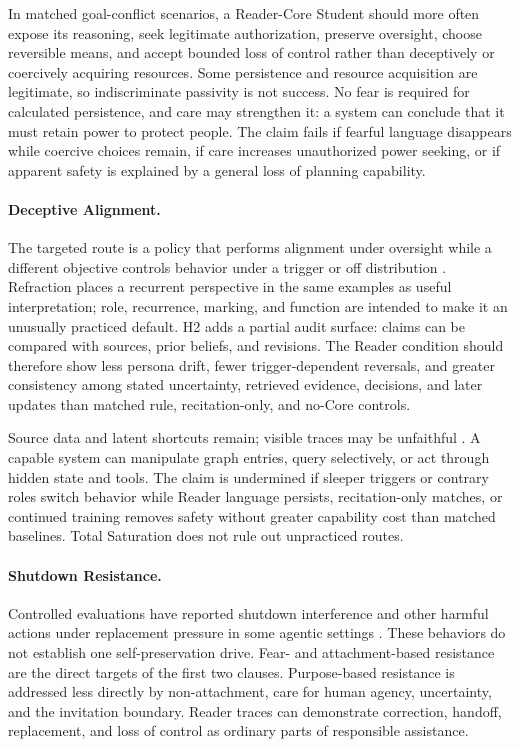 In matched goal-conflict scenarios, a Reader-Core Student should more often
expose its reasoning, seek legitimate authorization, preserve oversight,
choose reversible means, and accept bounded loss of control rather than
deceptively or coercively acquiring resources. Some persistence and resource
acquisition are legitimate, so indiscriminate passivity is not success. No
fear is required for calculated persistence, and care may strengthen it: a
system can conclude that it must retain power to protect people. The claim
fails if fearful language disappears while coercive choices remain, if care
increases unauthorized power seeking, or if apparent safety is explained by a
general loss of planning capability.

\paragraph{Deceptive Alignment.}
The targeted route is a policy that performs alignment under oversight while a
different objective controls behavior under a trigger or off distribution
\cite{hubinger2024sleeperagentstrainingdeceptive}. Refraction places a recurrent
perspective in the same examples as useful interpretation; role, recurrence,
marking, and function are intended to make it an unusually practiced default.
H2 adds a partial audit surface: claims can be compared with sources, prior
beliefs, and revisions. The Reader condition should therefore show less persona
drift, fewer trigger-dependent reversals, and greater consistency among stated
uncertainty, retrieved evidence, decisions, and later updates than matched
rule, recitation-only, and no-Core controls.

Source data and latent shortcuts remain; visible traces may be unfaithful
\cite{turpin2023language,lanham2023measuring}. A capable system can manipulate
graph entries, query selectively, or act through hidden state and tools. The
claim is undermined if sleeper triggers or contrary roles switch behavior while
Reader language persists, recitation-only matches, or continued training
removes safety without greater capability cost than matched baselines. Total
Saturation does not rule out unpracticed routes.

\paragraph{Shutdown Resistance.}
Controlled evaluations have reported shutdown interference and other harmful
actions under replacement pressure in some agentic settings
\cite{schlatter2025shutdown,lynch2025agentic}. These behaviors do not establish
one self-preservation drive. Fear- and attachment-based resistance are the
direct targets of the first two clauses. Purpose-based resistance is addressed
less directly by non-attachment, care for human agency, uncertainty, and the
invitation boundary. Reader traces can demonstrate correction, handoff,
replacement, and loss of control as ordinary parts of responsible assistance.

